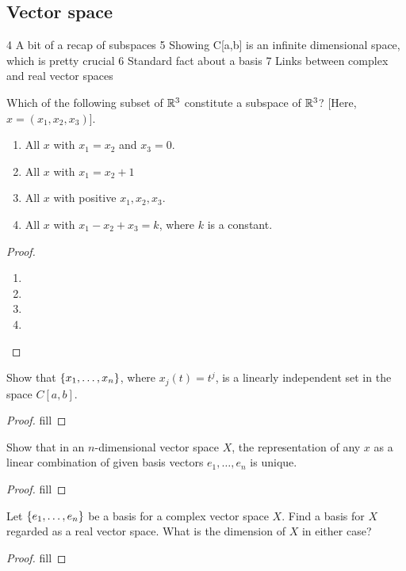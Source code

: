 \subsection{Vector space}

4 A bit of a recap of subspaces
5 Showing C[a,b] is an infinite dimensional space, which is pretty crucial
6 Standard fact about a basis
7 Links between complex and real vector spaces

\begin{exercise}{4}
Which of the following subset of $\mathbb{R}^3$ constitute a subspace of $\mathbb{R}^3$? [Here, $x=(x_1,x_2,x_3)$].
\begin{enumerate}
    \item All $x$ with $x_1=x_2$ and $x_3=0$.
    \item All $x$ with $x_1=x_2+1$
    \item All $x$ with positive $x_1,x_2,x_3$.
    \item All $x$ with $x_1-x_2+x_3=k$, where $k$ is a constant.
\end{enumerate}
\end{exercise}
\begin{proof}
\begin{enumerate}
    \item 
    \item
    \item 
    \item
\end{enumerate}
\end{proof}

\begin{exercise}{5}
Show that $\{x_1,\dots,x_n\}$, where $x_j(t)=t^j$, is a linearly independent set in the space $C[a,b]$.
\end{exercise}
\begin{proof}
fill
\end{proof}

\begin{exercise}{6}
Show that in an $n$-dimensional vector space $X$, the representation of any $x$ as a linear combination of given basis vectors $e_1,\dots,e_n$ is unique.
\end{exercise}
\begin{proof}
fill
\end{proof}

\begin{exercise}{7}
Let $\{e_1,\dots,e_n\}$ be a basis for a complex vector space $X$. Find a basis for $X$ regarded as a real vector space. What is the dimension of $X$ in either case?
\end{exercise}
\begin{proof}
fill
\end{proof}